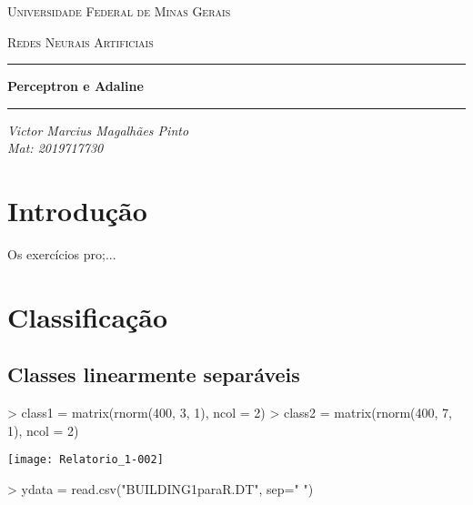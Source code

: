 \documentclass{article}
\begin{document}


\begin{center}

{\scshape\Large Universidade Federal de Minas Gerais \par}
{\scshape\large Redes Neurais Artificiais \par}
\vspace{5cm}

\hrule
\hfill

{\huge \textbf{Perceptron e Adaline}\par}
\hfill
\hrule
\hfill

\vspace{3cm}

{\large\itshape Victor Marcius Magalhães Pinto\\Mat: 2019717730\par}

\vspace{2cm}

\end{center}

\newpage

\section{Introdução}

Os exercícios pro;...

\section{Classificação}

\subsection{Classes linearmente separáveis}
\begin{Schunk}
\begin{Sinput}
> class1 = matrix(rnorm(400, 3, 1), ncol = 2)
> class2 = matrix(rnorm(400, 7, 1), ncol = 2)
\end{Sinput}
\end{Schunk}

\texttt{[image: Relatorio\_1-002]}


\begin{Schunk}
\begin{Sinput}
> ydata = read.csv("BUILDING1paraR.DT", sep=" ")
\end{Sinput}
\end{Schunk}
\end{document}
